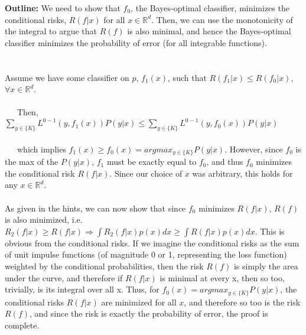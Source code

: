 \documentclass[12pt,letterpaper,boxed]{hmcpset}
\begin{document}
\begin{solution}
\textbf{Outline:} We need to show that $f_0$, the Bayes-optimal classifier, minimizes the conditional risks, $R(f|x)$ for all $x \in \mathbb{R}^d$. Then, we can use the monotonicity of the integral to argue that $R(f)$ is also minimal, and hence the Bayes-optimal classifier minimizes the probability of error (for all integrable functions). \\ \\ \\
Assume we have some classifier on $p$, $f_1(x)$, such that $R(f_1|x) \leq R(f_0|x)$, $\forall x \in \mathbb{R}^d$. \\ \\
\phantom{x}\ \ \ Then, $\sum\limits_{y \in \lbrace K \rbrace } L^{0-1}(y,f_1(x))P(y|x) \leq  \sum\limits_{y\in \lbrace K \rbrace} L^{0-1}(y,f_0(x))P(y|x)$\\ \\
\phantom{x}\ \ \ which implies $f_1(x) \geq f_0(x) = argmax_{y\in \lbrace K \rbrace} P(y|x)$. However, since $f_0$ is the max of the $P(y|x)$, $f_1$ must be exactly equal to $f_0$, and thus $f_0$ minimizes the conditional risk $R(f|x)$. Since our choice of $x$ was arbitrary, this holds for any $x \in \mathbb{R}^d$. \\ \\
As given in the hints, we can now show that since $f_0$ minimizes $R(f|x)$, $R(f)$ is also minimized, i.e. $R_2(f|x) \geq R(f|x) \Rightarrow \int R_2(f|x)p(x)dx \geq \int R(f|x)p(x)dx$. This is obvious from the conditional risks. If we imagine the conditional risks as the sum of unit impulse functions (of magnitude 0 or 1, representing the loss function) weighted by the conditional probabilities, then the risk $R(f)$ is simply the area under the curve, and therefore if $R(f|x)$ is minimal at every x, then so too, trivially, is its integral over all x. Thus, for $f_0(x) = argmax_{y \in \lbrace K \rbrace}P(y|x)$, the conditional risks $R(f|x)$ are minimized for all $x$, and therefore so too is the risk $R(f)$, and since the risk is exactly the probability of error, the proof is complete. 

\end{solution}
\end{document}
